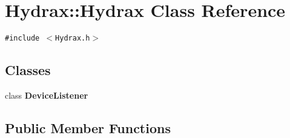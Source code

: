 \hypertarget{class_hydrax_1_1_hydrax}{
\section{Hydrax::Hydrax Class Reference}
\label{class_hydrax_1_1_hydrax}
}
{\tt \#include $<$Hydrax.h$>$}

\subsection*{Classes}
\begin{CompactItemize}
\item 
class \textbf{DeviceListener}
\end{CompactItemize}
\subsection*{Public Member Functions}
